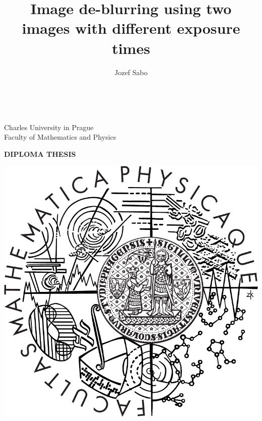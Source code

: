 \documentclass[12pt,notitlepage]{report}
\title{Image de-blurring using two images with different exposure times}   %
\author{Jozef Sabo} %
\begin{document}

 \pagestyle{empty}
\begin{titlepage}
\begin{center}
\ \\

\vspace{15mm}

\large
Charles University in Prague\\
Faculty of Mathematics and Physics\\

\vspace{5mm}

{\Large\bf DIPLOMA THESIS}

\vspace{10mm}

\includegraphics[scale=0.3]{mff_logo.pdf}


\end{center}
\end{titlepage}
\end{document}
